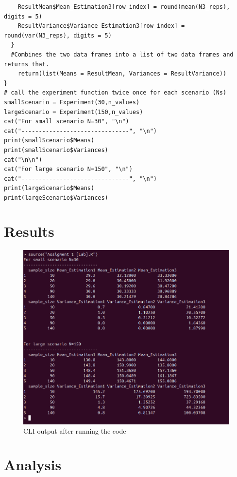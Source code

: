 \documentclass{report}
\begin{document}
\begin{verbatim}
    ResultMean$Mean_Estimation3[row_index] = round(mean(N3_reps), digits = 5)
    ResultVariance$Variance_Estimation3[row_index] = round(var(N3_reps), digits = 5) 
  }
  #Combines the two data frames into a list of two data frames and returns that. 
    return(list(Means = ResultMean, Variances = ResultVariance)) 
}
# call the experiment function twice once for each scenario (Ns)
smallScenario = Experiment(30,n_values)
largeScenario = Experiment(150,n_values)
cat("For small scenario N=30", "\n")
cat("-------------------------------", "\n")
print(smallScenario$Means)
print(smallScenario$Variances)
cat("\n\n")
cat("For large scenario N=150", "\n")
cat("-------------------------------", "\n")
print(largeScenario$Means)
print(largeScenario$Variances)
\end{verbatim}

\section{Results}
\begin{figure}[H]
    \centering
    \includegraphics[width=1\linewidth]{OutputOfRCode.png}
    \caption{CLI output after running the code}
    \label{fig:enter-label}
\end{figure}


\section{Analysis}
\end{document}
